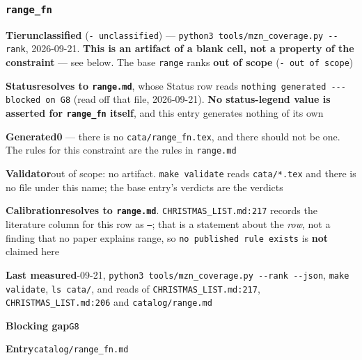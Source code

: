 \documentclass[10pt,a4paper]{article}
\newcommand{\entryfield}[2]{{\raggedright\textbf{#1}\quad #2\par}}
\begin{document}
\subsubsection*{\texttt{range\_\allowbreak{}fn}}
\label{entry:range-fn}
\entryfield{Tier}{\textbf{unclassified} (\texttt{- unclassified}) --- \texttt{python3 tools/\allowbreak{}mzn\_\allowbreak{}coverage.\allowbreak{}py -\allowbreak{}-\allowbreak{}rank}, 2026-09-21. \textbf{This is an artifact of a blank cell, not a property of the constraint} --- see below. The base \texttt{range} ranks \textbf{out of scope} (\texttt{- out of scope})}
\entryfield{Status}{\textbf{resolves to \texttt{range.md}}, whose Status row reads \texttt{nothing generated -\allowbreak{}-\allowbreak{}-\allowbreak{} blocked on G8} (read off that file, 2026-09-21). \textbf{No status-legend value is asserted for \texttt{range\_fn} itself}, and this entry generates nothing of its own}
\entryfield{Generated}{\textbf{0} --- there is no \texttt{cata/range\_fn.tex}, and there should not be one. The rules for this constraint are the rules in \texttt{range.md}}
\entryfield{Validator}{out of scope: no artifact. \texttt{make validate} reads \texttt{cata/*.tex} and there is no file under this name; the base entry's verdicts are the verdicts}
\entryfield{Calibration}{\textbf{resolves to \texttt{range.md}}. \texttt{CHRISTMAS\_LIST.md:217} records the literature column for this row as \texttt{---}; that is a statement about the \emph{row}, not a finding that no paper explains range, so \texttt{no published rule exists} is \textbf{not} claimed here}
\entryfield{Last measured}{2026-09-21, \texttt{python3 tools/\allowbreak{}mzn\_\allowbreak{}coverage.\allowbreak{}py -\allowbreak{}-\allowbreak{}rank -\allowbreak{}-\allowbreak{}json}, \texttt{make validate}, \texttt{ls cata/}, and reads of \texttt{CHRISTMAS\_LIST.md:217}, \texttt{CHRISTMAS\_LIST.md:206} and \texttt{catalog/range.md}}
\entryfield{Blocking gap}{\texttt{G8}}
\entryfield{Entry}{\texttt{catalog/range\_fn.md}}
\end{document}
